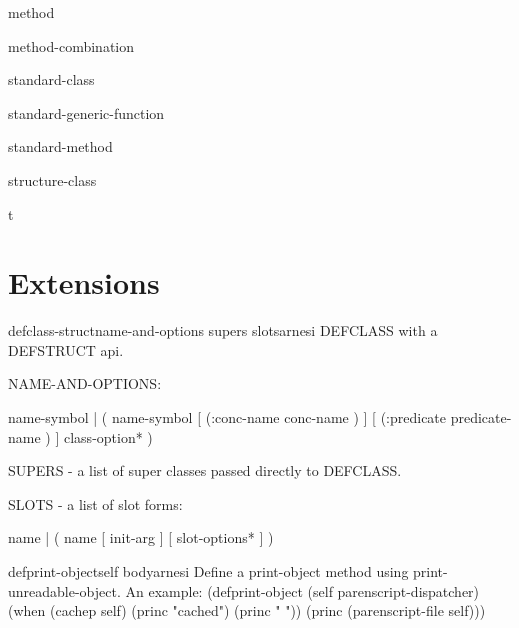 \begin{class}{method}{}{}{}
  
\end{class}

\begin{class}{method-combination}{}{}{}
  
\end{class}

\begin{class}{standard-class}{}{}{}
  
\end{class}

\begin{class}{standard-generic-function}{}{}{}
  
\end{class}

\begin{class}{standard-method}{}{}{}
  
\end{class}

\begin{class}{structure-class}{}{}{}
  
\end{class}

\begin{class}{t}{}{}{}
  
\end{class}

\section{Extensions}
\label{sec:extensions}

\begin{macro}{defclass-struct}{name-and-options supers \rest slots}{arnesi}{}
  DEFCLASS with a DEFSTRUCT api.

NAME-AND-OPTIONS:

  name-symbol |
  ( name-symbol [ (:conc-name conc-name ) ]
                [ (:predicate predicate-name ) ]
                class-option* )

SUPERS - a list of super classes passed directly to DEFCLASS.

SLOTS - a list of slot forms:

  name |
  ( name [ init-arg ] [ slot-options* ] )
\end{macro}

\begin{macro}{defprint-object}{self \body body}{arnesi}{}
  Define a print-object method using print-unreadable-object.
  An example:
  (defprint-object (self parenscript-dispatcher)
    (when (cachep self)
      (princ "cached")
      (princ " "))
    (princ (parenscript-file self)))
\end{macro}

